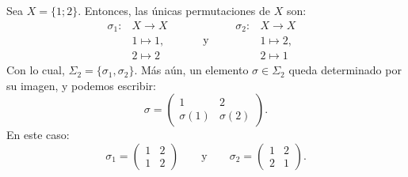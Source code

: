 \begin{ejemplo}
	\upshape
	Sea \(X = \{1; 2\}\). Entonces, las únicas permutaciones de \(X\) son:
	\[
	\begin{array}{rcl}
		\sigma_1: & X \to X & \\
		& 1 \mapsto 1, & \\
		& 2 \mapsto 2 &
	\end{array}
	\qquad \text{y} \qquad
	\begin{array}{rcl}
		\sigma_2: & X \to X & \\
		& 1 \mapsto 2, & \\
		& 2 \mapsto 1 &
	\end{array}
	\]
	Con lo cual, \(\Sigma_2 = \{\sigma_1, \sigma_2\}\). Más aún, un elemento \(\sigma \in \Sigma_2\) queda determinado por su imagen, y podemos escribir:
	\[
	\sigma = \left(\begin{array}{cc}
		1 & 2 \\
		\sigma(1) & \sigma(2)
	\end{array}\right).
	\]
	En este caso:
	\[
	\sigma_1 = \left(\begin{array}{cc}
		1 & 2 \\
		1 & 2
	\end{array}\right)
	\qquad \text{y} \qquad
	\sigma_2 = \left(\begin{array}{cc}
		1 & 2 \\
		2 & 1
	\end{array}\right). 
	\]
\end{ejemplo}

\medskip
\begin{observacion}
\end{observacion}

